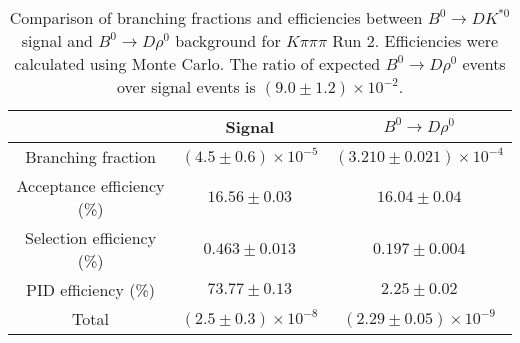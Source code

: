 \begin{table}
    \centering
    \begin{tabular}{ccc}
        \toprule
        & Signal & $B^0 \to D\rho^0$ \\
        \midrule
        Branching fraction & $(4.5 \pm 0.6) \times 10^{-5}$ & $(3.210 \pm 0.021) \times 10^{-4}$ \\
        Acceptance efficiency (\%) & $16.56 \pm 0.03$ & $16.04 \pm 0.04$ \\
        Selection efficiency (\%) & $0.463 \pm 0.013$ & $0.197 \pm 0.004$ \\
        PID efficiency (\%) & $73.77 \pm 0.13$ & $2.25 \pm 0.02$ \\
        \midrule
        Total & $(2.5 \pm 0.3) \times 10^{-8}$ & $(2.29 \pm 0.05) \times 10^{-9}$ \\
        \bottomrule
        \end{tabular}
        \caption{Comparison of branching fractions and efficiencies between $B^0 \to DK^{*0}$ signal and $B^0 \to D\rho^0$ background for $K\pi\pi\pi$ Run 2. Efficiencies were calculated using Monte Carlo. The ratio of expected $B^0 \to D\rho^0$ events over signal events is $(9.0 \pm 1.2) \times 10^{-2}$.}
\label{tab:rho_efficiency_Kpipipi_run2}
\end{table}
